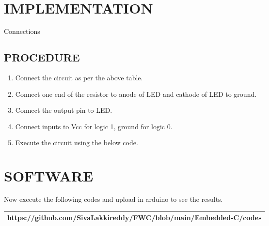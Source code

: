 \documentclass{article}
\begin{document}
\section{IMPLEMENTATION}
  \begin{table}[ht!]
    \centering	  
  
  \caption{Connections} 
  \label{Table:Connections}
  \end{table}
\bigskip

\subsection{PROCEDURE}
\begin{enumerate} 
\item Connect the circuit as per the above table.
\item Connect one end of the resistor to anode of LED and cathode of LED to ground.
\item Connect the output pin to LED.
\item Connect inputs to Vcc for logic 1, ground for logic 0.
\item Execute the circuit using the below code.
\end{enumerate}

\section{SOFTWARE}
  Now execute the following codes and upload in arduino to see the results.\\


\begin{tabularx}{1\textwidth} { 
  | >{\centering\arraybackslash}X |}
  \hline
  https://github.com/SivaLakkireddy/FWC/blob/main/Embedded-C/codes\\
  \hline
\end{tabularx}



\end{document}
